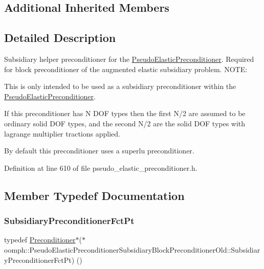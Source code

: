\subsection*{Additional Inherited Members}


\subsection{Detailed Description}
Subsidiary helper preconditioner for the \hyperlink{classoomph_1_1PseudoElasticPreconditioner}{Pseudo\+Elastic\+Preconditioner}. Required for block preconditioner of the augmented elastic subsidiary problem. N\+O\+TE\+:
\begin{DoxyEnumerate}
\item This is only intended to be used as a subsidiary preconditioner within the \hyperlink{classoomph_1_1PseudoElasticPreconditioner}{Pseudo\+Elastic\+Preconditioner}.
\item If this preconditioner has N D\+OF types then the first N/2 are assumed to be ordinary solid D\+OF types, and the second N/2 are the solid D\+OF types with lagrange multiplier tractions applied.
\item By default this preconditioner uses a superlu preconditioner. 
\end{DoxyEnumerate}

Definition at line 610 of file pseudo\+\_\+elastic\+\_\+preconditioner.\+h.



\subsection{Member Typedef Documentation}
\mbox{\label{classoomph_1_1PseudoElasticPreconditionerSubsidiaryBlockPreconditionerOld_a85f57923e70244d5fde0538946eb8c3d}} 
\subsubsection{\texorpdfstring{Subsidiary\+Preconditioner\+Fct\+Pt}{SubsidiaryPreconditionerFctPt}}
{\footnotesize\ttfamily typedef \hyperlink{classoomph_1_1Preconditioner}{Preconditioner}$\ast$($\ast$ oomph\+::\+Pseudo\+Elastic\+Preconditioner\+Subsidiary\+Block\+Preconditioner\+Old\+::\+Subsidiary\+Preconditioner\+Fct\+Pt) ()}



